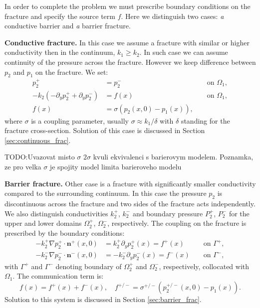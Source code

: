 \documentclass[a4paper,10pt]{article}
\def\prtl{\partial} %
\def\grad{\nabla}
\def\vc#1{\mathbf{\boldsymbol{#1}}}     %
\def\todo#1{{TODO:\color{red}#1}}
\begin{document}
In order to complete the problem we must prescribe boundary conditions on the fracture and specify the source term $f$. Here we 
distinguish two cases: {\emph a conductive barrier} and {\emph a barrier fracture}.


{\bf Conductive fracture.} In this case we assume a fracture with similar or higher conductivity then in the continuum, $k_1 \ge k_2$.
In such case we can assume continuity of the pressure across the fracture. However we keep difference between $p_2$ and $p_1$ on the fracture.
We set:
\begin{align}
  \label{eq:c_coupling_a}
  p_2^+ &= p_2^-                &&\text{ on }\Omega_1,\\
  -k_2 (-\prtl_y p_2^+ + \prtl_y p_2^-) &= f(x)         &&\text{ on }\Omega_1,\\
  f(x) &= \sigma (p_2(x,0) - p_1(x)),   &&
  \label{eq:c_coupling_c}
\end{align}
where $\sigma$ is a coupling parameter, usually $\sigma \approx k_1 / \delta$ with $\delta$ standing for the fracture cross-section. 
Solution of this case is discussed in Section \ref{sec:continuous_frac}.

\todo{Uvazovat misto $\sigma$ $2\sigma$ kvuli ekvivalenci s barierovym modelem. Poznamka, ze pro velka $\sigma$ je spojity model limita barieroveho modelu }    


{\bf Barrier fracture.} Other case is a fracture with significantly smaller conductivity compared to the surrounding continuum. In this case
the pressure $p_2$ is discontinuous across the fracture and two sides of the fracture acts independently. We also 
distinguish conductivities $k_2^+$, $k_2^-$ and boundary pressure $P_2^+$, $P_2^-$ for the upper and lower domains $\Omega_2^+$, $\Omega_2^-$, 
respectively. The coupling on the fracture is prescribed by the boundary conditions:
\begin{align}
  \label{eq:bc_barrier_p}  
  - k_2^+ \grad p_2^+\cdot \vc n^+(x,0) &= k_2^+ \prtl_y p_2^+(x) = f^+(x) 
                    &&\text{ on }\Gamma^{+},\\
  \label{eq:bc_barrier_m}
  - k_2^- \grad p_2^-\cdot \vc n^-(x,0) &= -k_2^- \prtl_y p_2^-(x) = f^-(x) 
                    &&\text{ on }\Gamma^{-},
\end{align}
with $\Gamma^{+}$ and $\Gamma^{-}$ denoting boundary of $\Omega_2^+$ and $\Omega_2^-$, respectively, collocated with $\Omega_1$.
The communication term is:
\begin{equation}
  \label{eq:coupling_barrier}
  f(x) = f^+(x) + f^-(x),\quad f^{+/-} = \sigma^{+/-} (p^{+/-}_2(x,0) - p_1(x)).
\end{equation}
Solution to this system is discussed in Section \ref{sec:barrier_frac}. 
\end{document}
